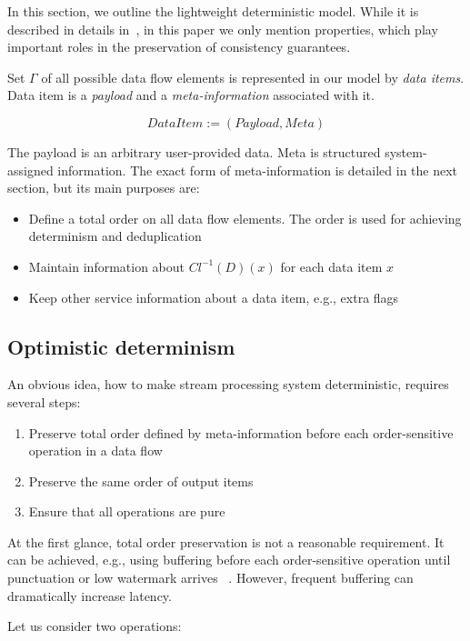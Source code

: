 
\label {fs-model-section}

In this section, we outline the lightweight deterministic model. While it is described in details in~\cite{we2018adbis}, in this paper we only mention properties, which play important roles in the preservation of consistency guarantees.

Set $\Gamma$ of all possible data flow elements is represented in our model by {\em data items}. Data item is a {\it payload} and a {\it meta-information} associated with it.

\[DataItem := (Payload, Meta)\]

The payload is an arbitrary user-provided data. Meta is structured system-assigned information. The exact form of meta-information is detailed in the next section, but its main purposes are:
\begin{itemize}
    \item Define a total order on all data flow elements. The order is used for achieving determinism and deduplication
    \item Maintain information about $Cl^{-1}(D)(x)$ for each data item $x$
    \item Keep other service information about a data item, e.g., extra flags
\end{itemize}

\subsection{Optimistic determinism}

An obvious idea, how to make stream processing system deterministic, requires several steps:
\begin{enumerate}
    \item Preserve total order defined by meta-information before each order-sensitive operation in a data flow
    \item Preserve the same order of output items
    \item Ensure that all operations are pure
\end{enumerate}

At the first glance, total order preservation is not a reasonable requirement. It can be achieved, e.g., using buffering before each order-sensitive operation until punctuation or low watermark arrives ~\cite{Li:2008:OPN:1453856.1453890}. However, frequent buffering can dramatically increase latency. 

Let us consider two operations:


